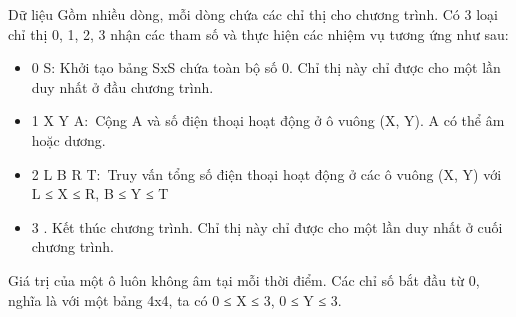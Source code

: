 Dữ liệu
Gồm nhiều dòng, mỗi dòng chứa các chỉ thị cho chương trình. Có 3 loại chỉ thị 0, 1, 2, 3 nhận các tham số và thực hiện các nhiệm vụ tương ứng như sau:
\begin{itemize}
	\item 0 S: Khởi tạo bảng SxS chứa toàn bộ số 0. Chỉ thị này chỉ được cho một lần duy nhất ở đầu chương trình.
	\item 1 X Y A: Cộng A và số điện thoại hoạt động ở ô vuông (X, Y). A có thể âm hoặc dương.
	\item 2 L B R T: Truy vấn tổng số điện thoại hoạt động ở các ô vuông (X, Y) với L ≤ X ≤ R, B ≤ Y ≤ T
	\item 3 . Kết thúc chương trình. Chỉ thị này chỉ được cho một lần duy nhất ở cuối chương trình.
\end{itemize}

Giá trị của một ô luôn không âm tại mỗi thời điểm. Các chỉ số bắt đầu từ 0, nghĩa là với một bảng 4x4, ta có 0 ≤ X ≤ 3, 0 ≤ Y ≤ 3.